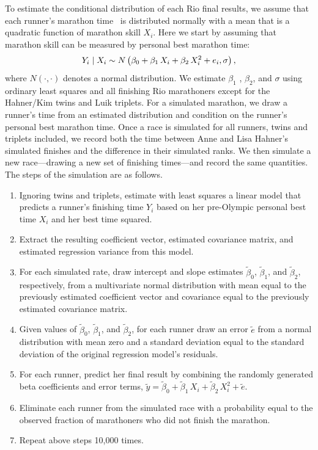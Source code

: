 \documentclass[12pt,titlepage]{article}
\begin{document}
To estimate the conditional distribution of each Rio final results, we
assume that each runner's marathon time \Yi\ is distributed normally
with a mean that is a quadratic function of marathon skill $X_i$. Here
we start by assuming that marathon skill can be measured by personal
best marathon time:
$$Y_i \mid X_i \sim N\left(\beta_0 + \beta_1\,X_{i} + \beta_2\,X^2_{i}  + e_i, \sigma\right),$$
where $N\left(\cdot,\cdot\right)$ denotes a normal distribution.  We
estimate $\beta_1$ , $\beta_2$, and $\sigma$ using ordinary least
squares and all finishing Rio marathoners except for the Hahner/Kim
twins and Luik triplets.  For a simulated marathon, we draw a runner's
time from an estimated distribution and condition on the runner's
personal best marathon time.  Once a race is simulated for all
runners, twins and triplets included, we record both the time between
Anne and Lisa Hahner's simulated finishes and the difference in their
simulated ranks.  We then simulate a new race---drawing a new set of
finishing times---and record the same quantities. The steps of the
simulation are as follows.
\begin{enumerate}
\item Ignoring twins and triplets, estimate with least squares a
  linear model that predicts a runner's finishing time $Y_i$ based on
  her pre-Olympic personal best time $X_i$ and her best time squared.
\item Extract the resulting coefficient vector, estimated covariance
  matrix, and estimated regression variance from this model.
\item For each simulated rate, draw intercept and slope estimates
  $\tilde{\beta}_0$, $\tilde{\beta}_1$, and $\tilde{\beta}_2$,
  respectively, from a multivariate normal distribution with mean
  equal to the previously estimated coefficient vector and covariance
  equal to the previously estimated covariance matrix.
\item Given values of $\tilde{\beta}_0$, $\tilde{\beta}_1$, and
  $\tilde{\beta}_2$, for each runner draw an error $\tilde{e}$ from a
  normal distribution with mean zero and a standard deviation equal to
  the standard deviation of the original regression model's residuals.
\item For each runner, predict her final result by combining the
  randomly generated beta coefficients and error terms,
  $\tilde{y} = \tilde{\beta}_0 + \tilde{\beta}_1\,X_i +
  \tilde{\beta}_2\,X_i^2 + \tilde{e}$.
\item Eliminate each runner from the simulated race with a probability
  equal to the observed fraction of marathoners who did not finish the
  marathon.
\item Repeat above steps 10,000 times.
\end{enumerate}
\end{document}
